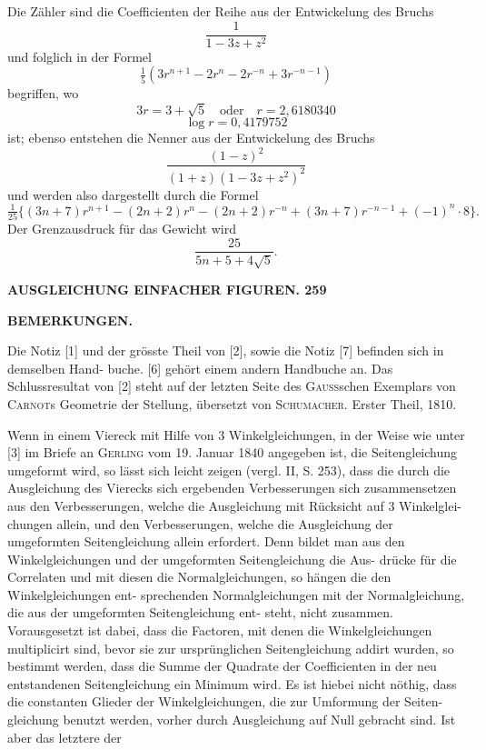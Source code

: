 \documentclass[12pt,a4paper]{article}
\theoremstyle{plain}
\theoremstyle{definition}
\theoremstyle{remark}
\begin{document}
Die Z\"ahler sind die Coefficienten der Reihe aus der Entwickelung des
Bruchs
\[
\frac{1}{1 - 3z + z^2}
\]
und folglich in der Formel
\[
\tfrac{1}{5}(3r^{n+1} - 2r^n - 2r^{-n} + 3r^{-n-1})
\]
begriffen, wo
\[
3r = 3 + \sqrt{5} \quad\text{oder}\quad r = 2{,}6180340
\]
\[
\log r = 0{,}4179752
\]
ist; ebenso entstehen die Nenner aus der Entwickelung des Bruchs
\[
\frac{(1 - z)^2}{(1 + z)(1 - 3z + z^2)^2}
\]
und werden also dargestellt durch die Formel
\[
\tfrac{1}{25}\{(3n + 7)r^{n+1} - (2n + 2)r^n - (2n + 2)r^{-n} + (3n + 7)r^{-n-1} + (-1)^n \cdot 8\}.
\]
Der Grenzausdruck f\"ur das Gewicht wird
\[
\frac{25}{5n + 5 + 4\sqrt{5}}.
\]


\newpage

\noindent\textbf{AUSGLEICHUNG EINFACHER FIGUREN. 259}

\begin{center}\textbf{BEMERKUNGEN.}\end{center}

Die Notiz [1] und der gr\"osste Theil von [2], sowie die Notiz [7] befinden sich in demselben Hand-
buche. [6] geh\"ort einem andern Handbuche an. Das Schlussresultat von [2] steht auf der letzten Seite
des \textsc{Gauss}schen Exemplars von \textsc{Carnot}s Geometrie der Stellung, \"ubersetzt von \textsc{Schumacher}. Erster
Theil, 1810.

Wenn in einem Viereck mit Hilfe von 3 Winkelgleichungen, in der Weise wie unter [3] im Briefe
an \textsc{Gerling} vom 19. Januar 1840 angegeben ist, die Seitengleichung umgeformt wird, so l\"asst sich leicht
zeigen (vergl. II, S. 253), dass die durch die Ausgleichung des Vierecks sich ergebenden Verbesserungen
sich zusammensetzen aus den Verbesserungen, welche die Ausgleichung mit R\"ucksicht auf 3 Winkelglei-
chungen allein, und den Verbesserungen, welche die Ausgleichung der umgeformten Seitengleichung allein
erfordert. Denn bildet man aus den Winkelgleichungen und der umgeformten Seitengleichung die Aus-
dr\"ucke f\"ur die Correlaten und mit diesen die Normalgleichungen, so h\"angen die den Winkelgleichungen ent-
sprechenden Normalgleichungen mit der Normalgleichung, die aus der umgeformten Seitengleichung ent-
steht, nicht zusammen. Vorausgesetzt ist dabei, dass die Factoren, mit denen die Winkelgleichungen
multiplicirt sind, bevor sie zur urspr\"unglichen Seitengleichung addirt wurden, so bestimmt werden, dass die
Summe der Quadrate der Coefficienten in der neu entstandenen Seitengleichung ein Minimum wird. Es ist
hiebei nicht n\"othig, dass die constanten Glieder der Winkelgleichungen, die zur Umformung der Seiten-
gleichung benutzt werden, vorher durch Ausgleichung auf Null gebracht sind. Ist aber das letztere der
\end{document}
